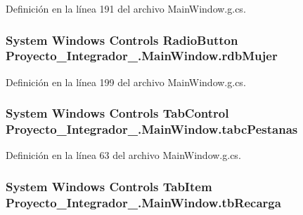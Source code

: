 Definición en la línea 191 del archivo Main\-Window.\-g.\-cs.

\hypertarget{class_proyecto___integrador__3_1_1_main_window_ad63d95f7d01cf55567a764c385df5542}{
\subsubsection[{rdb\-Mujer}]{\setlength{\rightskip}{0pt plus 5cm}System Windows Controls Radio\-Button Proyecto\-\_\-\-Integrador\-\_.\-Main\-Window.\-rdb\-Mujer\hspace{0.3cm}{\ttfamily [package]}}}\label{class_proyecto___integrador__3_1_1_main_window_ad63d95f7d01cf55567a764c385df5542}


Definición en la línea 199 del archivo Main\-Window.\-g.\-cs.

\hypertarget{class_proyecto___integrador__3_1_1_main_window_a46bffd3bc6bf702252e6568b9c00f35c}{
\subsubsection[{tabc\-Pestanas}]{\setlength{\rightskip}{0pt plus 5cm}System Windows Controls Tab\-Control Proyecto\-\_\-\-Integrador\-\_.\-Main\-Window.\-tabc\-Pestanas\hspace{0.3cm}{\ttfamily [package]}}}\label{class_proyecto___integrador__3_1_1_main_window_a46bffd3bc6bf702252e6568b9c00f35c}


Definición en la línea 63 del archivo Main\-Window.\-g.\-cs.

\hypertarget{class_proyecto___integrador__3_1_1_main_window_af0f488983962bf0457a4b9d02c1df2a6}{
\subsubsection[{tb\-Recarga}]{\setlength{\rightskip}{0pt plus 5cm}System Windows Controls Tab\-Item Proyecto\-\_\-\-Integrador\-\_.\-Main\-Window.\-tb\-Recarga\hspace{0.3cm}{\ttfamily [package]}}}\label{class_proyecto___integrador__3_1_1_main_window_af0f488983962bf0457a4b9d02c1df2a6}


